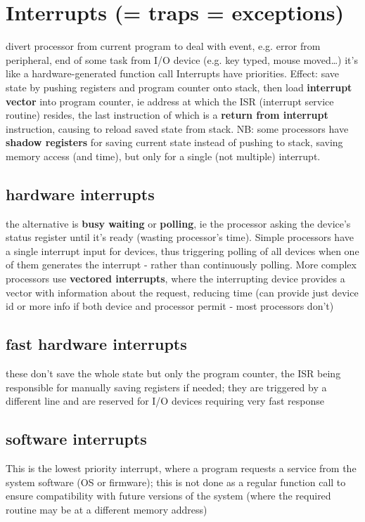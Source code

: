 \documentclass[11pt]{article}
\begin{document}
\section{Interrupts (= traps = exceptions)}
\label{sec:org9d2e579}
divert processor from current program to deal with event, e.g. error from
peripheral, end of some task from I/O device (e.g. key typed, mouse moved\ldots{})
it's like a hardware-generated function call
Interrupts have priorities.
Effect: save state by pushing registers and program counter onto stack, then
load \textbf{\textbf{interrupt vector}} into program counter, ie address at which the ISR
(interrupt service routine) resides, the last instruction of which is a 
\textbf{\textbf{return from interrupt}} instruction, causing to reload saved state from stack.
NB: some processors have \textbf{\textbf{shadow registers}} for saving current state instead
of pushing to stack, saving memory access (and time), but only for a single (not
multiple) interrupt.
\subsection{hardware interrupts}
\label{sec:orgdbe226f}
the alternative is \textbf{\textbf{busy waiting}} or \textbf{\textbf{polling}}, ie the processor asking the
device's status register until it's ready (wasting processor's time).
Simple processors have a single interrupt input for devices, thus triggering
polling of all devices when one of them generates the interrupt - rather than
continuously polling.
More complex processors use \textbf{\textbf{vectored interrupts}}, where the interrupting
device provides a vector with information about the request, reducing time (can
provide just device id or more info if both device and processor permit - most
processors don't)
\subsection{fast hardware interrupts}
\label{sec:org588eca6}
these don't save the whole state but only the program counter, the ISR being
responsible for manually saving registers if needed; they are triggered by a
different line and are reserved for I/O devices requiring very fast response
\subsection{software interrupts}
\label{sec:orga189433}
This is the lowest priority interrupt, where a program requests a service from
the system software (OS or firmware); this is not done as a regular function
call to ensure compatibility with future versions of the system (where the
required routine may be at a different memory address)
\end{document}
